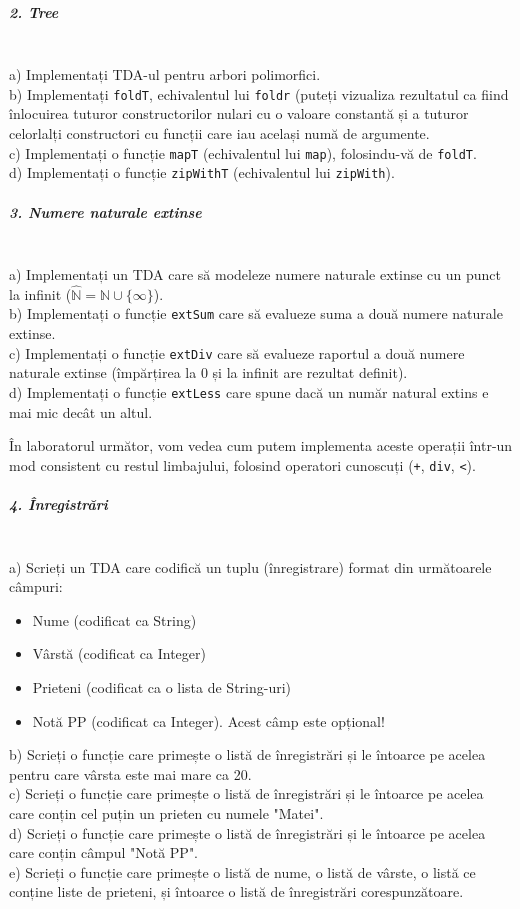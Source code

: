 \subparagraph{ 2. Tree }\hfill\\
a) Implementați TDA-ul pentru arbori polimorfici.\\b) Implementați \texttt{foldT}, echivalentul lui \texttt{foldr} (puteți vizualiza rezultatul ca fiind înlocuirea tuturor constructorilor nulari cu o valoare constantă și a tuturor celorlalți constructori cu funcții care iau același numă de argumente.\\c) Implementați o funcție \texttt{mapT} (echivalentul lui \texttt{map}), folosindu-vă de \texttt{foldT}.\\d) Implementați o funcție \texttt{zipWithT} (echivalentul lui \texttt{zipWith}).\\
\subparagraph{ 3. Numere naturale extinse }\hfill\\
a) Implementați un TDA care să modeleze numere naturale extinse cu un punct la infinit ($ \hat{\mathbb{N}} = \mathbb{N} \cup \{ \infty \}$).\\b) Implementați o funcție \texttt{extSum} care să evalueze suma a două numere naturale extinse.\\c) Implementați o funcție \texttt{extDiv} care să evalueze raportul a două numere naturale extinse (împărțirea la 0 și la infinit are rezultat definit).\\d) Implementați o funcție \texttt{extLess} care spune dacă un număr natural extins e mai mic decât un altul.

În laboratorul următor, vom vedea cum putem implementa aceste operații într-un mod consistent cu restul limbajului, folosind operatori cunoscuți (\texttt{+}, \texttt{div}, \texttt{\textless }).
                   
\subparagraph{ 4. Înregistrări }\hfill\\

a) Scrieți un TDA care codifică un tuplu (înregistrare) format din următoarele câmpuri:
   \begin{itemize}
   	\item  Nume (codificat ca String)
   	\item  Vârstă (codificat ca Integer)
   	\item  Prieteni (codificat ca o lista de String-uri)
   	\item  Notă PP (codificat ca Integer). Acest câmp este opțional!
   \end{itemize}

b) Scrieți o funcție care primește o listă de înregistrări și le întoarce pe acelea pentru care vârsta este mai mare ca 20.\\c) Scrieți o funcție care primește o listă de înregistrări și le întoarce pe acelea care conțin cel puțin un prieten cu numele "Matei".\\d) Scrieți o funcție care primește o listă de înregistrări și le întoarce pe acelea care conțin câmpul "Notă PP".\\e) Scrieți o funcție care primește o listă de nume, o listă de vârste, o listă ce conține liste de prieteni, și întoarce o listă de înregistrări corespunzătoare.

